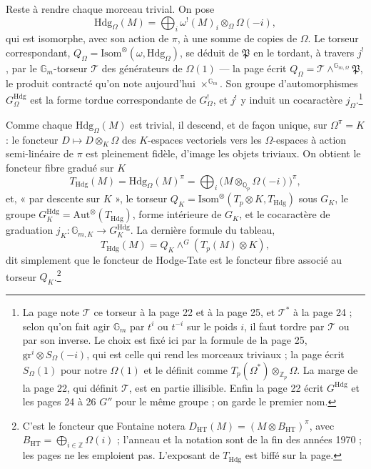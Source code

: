 \documentclass[11pt,a4paper]{article}
\begin{document}
Reste à rendre chaque morceau trivial. On pose
\[
\mathrm{Hdg}_{\Omega}(M) = \bigoplus_i \omega^{!}(M)_i \otimes_{\Omega}
\Omega(-i),
\]
qui est isomorphe, avec son action de $\pi$, à une somme de copies de
$\Omega$. Le torseur correspondant,
$Q_{\Omega} = \mathrm{Isom}^{\otimes}(\omega, \mathrm{Hdg}_{\Omega})$, se
déduit de $\mathfrak{P}$ en le tordant, à travers $j^{!}$, par le
$\mathbb{G}_m$-torseur $\mathcal{T}$ des générateurs de $\Omega(1)$ --- la
page écrit $Q_{\Omega} = \mathcal{T} \wedge^{\mathbb{G}_{m,\Omega}}
\mathfrak{P}$, le produit contracté qu'on note aujourd'hui
$\times^{\mathbb{G}_m}$. Son groupe d'automorphismes $G^{\mathrm{Hdg}}_{\Omega}$
est la forme tordue correspondante de $G^{!}_{\Omega}$, et $j^{!}$ y induit un
cocaractère $j_{\Omega}$.\footnote{La page note $\mathcal{T}$ ce torseur à la
page 22 et à la page 25, et $\mathcal{T}^{*}$ à la page 24 ; selon qu'on fait
agir $\mathbb{G}_m$ par $t^i$ ou $t^{-i}$ sur le poids $i$, il faut tordre par
$\mathcal{T}$ ou par son inverse. Le choix est fixé ici par la formule de la
page 25, $\mathrm{gr}^i \otimes S_{\Omega}(-i)$, qui est celle qui rend les
morceaux triviaux ; la page écrit $S_{\Omega}(1)$ pour notre $\Omega(1)$ et le
définit comme $T_p(\Omega^{*}) \otimes_{\mathbb{Z}_p} \Omega$. La marge de la
page 22, qui définit $\mathcal{T}$, est en partie illisible. Enfin la page 22
écrit $G^{\mathrm{Hdg}}$ et les pages 24 à 26 $G''$ pour le même groupe ; on
garde le premier nom.}

Comme chaque $\mathrm{Hdg}_{\Omega}(M)$ est trivial, il descend, et de façon
unique, sur $\Omega^{\pi} = K$ : le foncteur $D \mapsto D \otimes_K \Omega$ des
$K$-espaces vectoriels vers les $\Omega$-espaces à action semi-linéaire de
$\pi$ est pleinement fidèle, d'image les objets triviaux. On obtient le
foncteur fibre gradué sur $K$
\[
T_{\mathrm{Hdg}}(M) = \mathrm{Hdg}_{\Omega}(M)^{\pi} = \bigoplus_i \bigl(M
\otimes_{\mathbb{Q}_p} \Omega(-i)\bigr)^{\pi},
\]
et, « par descente sur $K$ », le torseur $Q_K =
\mathrm{Isom}^{\otimes}(T_p \otimes K, T_{\mathrm{Hdg}})$ sous $G_K$, le groupe
$G^{\mathrm{Hdg}}_K = \mathrm{Aut}^{\otimes}(T_{\mathrm{Hdg}})$, forme
intérieure de $G_K$, et le cocaractère de graduation $j_K :
\mathbb{G}_{m,K} \to G^{\mathrm{Hdg}}_K$. La dernière formule du tableau,
\[
T_{\mathrm{Hdg}}(M) = Q_K \wedge^{G} (T_p(M) \otimes K),
\]
dit simplement que le foncteur de Hodge-Tate est le foncteur fibre associé au
torseur $Q_K$.\footnote{C'est le foncteur que Fontaine notera
$D_{\mathrm{HT}}(M) = (M \otimes B_{\mathrm{HT}})^{\pi}$, avec
$B_{\mathrm{HT}} = \bigoplus_{i \in \mathbb{Z}} \Omega(i)$ ; l'anneau et la
notation sont de la fin des années 1970 ; les pages ne les emploient pas.
L'exposant de
$T_{\mathrm{Hdg}}$ est biffé sur la page.}
\end{document}
